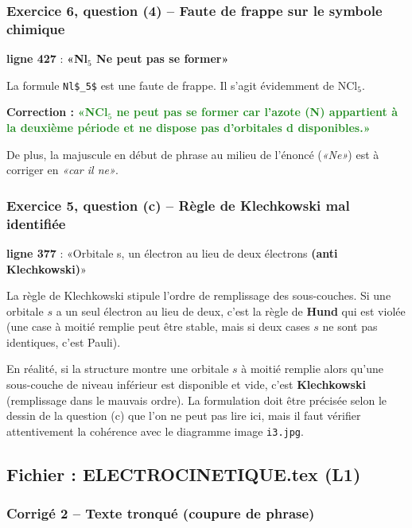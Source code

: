 \documentclass[12pt,a4paper]{article}
\newcommand{\fichier}[1]{\texttt{\small\color{Purple}#1}}
\newcommand{\ligne}[1]{\textbf{ligne #1}}
\newcommand{\correct}[1]{\textcolor{ForestGreen}{\textbf{#1}}}
\newcommand{\faux}[1]{\textcolor{BrickRed}{\textbf{#1}}}
\begin{document}
\subsubsection{Exercice 6, question (4) -- Faute de frappe sur le symbole chimique}

\begin{erreur}
\ligne{427} : \faux{«Nl$_5$ Ne peut pas se former»}

La formule \verb|Nl$_5$| est une faute de frappe. Il s'agit évidemment de NCl$_5$.

\textbf{Correction :} \correct{«NCl$_5$ ne peut pas se former car l'azote (N) appartient à la deuxième période et ne dispose pas d'orbitales d disponibles.»}

De plus, la majuscule en début de phrase au milieu de l'énoncé (\textit{«Ne»}) est à corriger en \textit{«car il ne»}.
\end{erreur}

\subsubsection{Exercice 5, question (c) -- Règle de Klechkowski mal identifiée}

\begin{avertissement}
\ligne{377} : «Orbitale s, un électron au lieu de deux électrons \faux{(anti Klechkowski)}»

La règle de Klechkowski stipule l'ordre de remplissage des sous-couches. Si une orbitale $s$ a un seul électron au lieu de deux, c'est la règle de \textbf{Hund} qui est violée (une case à moitié remplie peut être stable, mais si deux cases $s$ ne sont pas identiques, c'est Pauli).

En réalité, si la structure montre une orbitale $s$ à moitié remplie alors qu'une sous-couche de niveau inférieur est disponible et vide, c'est \textbf{Klechkowski} (remplissage dans le mauvais ordre). La formulation doit être précisée selon le dessin de la question (c) que l'on ne peut pas lire ici, mais il faut vérifier attentivement la cohérence avec le diagramme image \fichier{i3.jpg}.
\end{avertissement}

\subsection{Fichier : ELECTROCINETIQUE.tex (L1)}

\subsubsection{Corrigé 2 -- Texte tronqué (coupure de phrase)}
\end{document}

